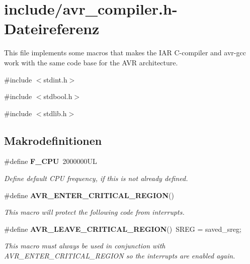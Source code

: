 \section{include/avr\_\-compiler.h-\/Dateireferenz}
\label{avr__compiler_8h}


This file implements some macros that makes the IAR C-\/compiler and avr-\/gcc work with the same code base for the AVR architecture.  


{\ttfamily \#include $<$stdint.h$>$}\par
{\ttfamily \#include $<$stdbool.h$>$}\par
{\ttfamily \#include $<$stdlib.h$>$}\par
\subsection*{Makrodefinitionen}
\begin{DoxyCompactItemize}
\item 
\#define {\bf F\_\-CPU}~2000000UL
\begin{DoxyCompactList}\small\item\em Define default CPU frequency, if this is not already defined. \item\end{DoxyCompactList}\item 
\#define {\bf AVR\_\-ENTER\_\-CRITICAL\_\-REGION}()
\begin{DoxyCompactList}\small\item\em This macro will protect the following code from interrupts. \item\end{DoxyCompactList}\item 
\#define {\bf AVR\_\-LEAVE\_\-CRITICAL\_\-REGION}()~SREG = saved\_\-sreg;
\begin{DoxyCompactList}\small\item\em This macro must always be used in conjunction with AVR\_\-ENTER\_\-CRITICAL\_\-REGION so the interrupts are enabled again. \item\end{DoxyCompactList}\end{DoxyCompactItemize}


